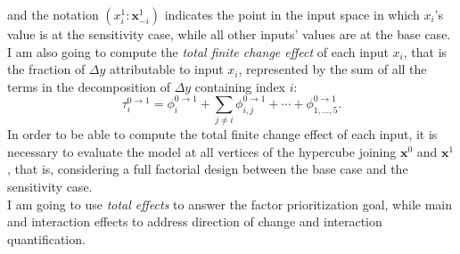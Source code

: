 and the notation $(x_i^1 : \mathbf{x}_{-i}^1)$ indicates the point in the input space in which $x_i$'s value is at the sensitivity case, while all other inputs' values are at the base case.
I am also going to compute the \textit{total finite change effect} of each input $x_i$, that is the fraction of $\Delta y$ attributable to input $x_i$, represented by the sum of all the terms in the decomposition of $\Delta y$ containing index $i$:
\[
\tau_i^{0 \rightarrow 1} =  \phi_i^{0 \rightarrow 1} + \sum_{j \neq i}  \phi_{i,j}^{0 \rightarrow 1} + \cdots + \phi_{1,...,5}^{0 \rightarrow 1}.
\]
In order to be able to compute the total finite change effect of each input, it is necessary to evaluate the model at all vertices of 
the hypercube joining $\textbf{x}^0$ and $\textbf{x}^1$, that is, considering a full factorial design between the base case and the sensitivity case. \\
I am going to use \textit{total effects} to answer the factor prioritization goal, while main and interaction effects to address direction of change and interaction quantification.


